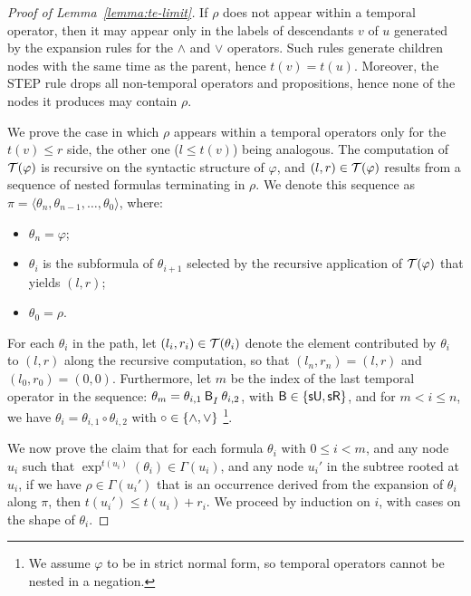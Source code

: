\documentclass{easychair}
\begin{document}
\begin{proof}[Proof of Lemma~\ref{lemma:te-limit}]
    If $\rho$ does not appear within a temporal operator, then it may appear only in the labels of descendants $v$ of $u$ generated by the expansion rules for the $\land$ and $\lor$ operators.
    Such rules generate children nodes with the same time as the parent, hence $t(v) = t(u)$.
    Moreover, the \textsf{STEP} rule drops all non-temporal operators and propositions, hence none of the nodes it produces may contain $\rho$.

    We prove the case in which $\rho$ appears within a temporal operators only for the $t(v) \leq r$ side, the other one ($l \leq t(v)$) being analogous.
    The computation of $\tinv(\varphi)$ is recursive on the syntactic structure of $\varphi$, and $(l,r) \in \tinv(\varphi)$ results from a sequence of nested formulas terminating in $\rho$.
    We denote this sequence as $\pi = \langle \theta_n, \theta_{n-1}, \ldots, \theta_0 \rangle$, where:
    \begin{itemize}[nosep]
        \item $\theta_n = \varphi$;
        \item $\theta_{i}$ is the subformula of $\theta_{i+1}$ selected by the recursive application of $\tinv(\varphi)$ that yields $(l,r)$;
        \item $\theta_0 = \rho$.
    \end{itemize}
    For each $\theta_i$ in the path, let $(l_i, r_i) \in \tinv(\theta_i)$ denote the element contributed by $\theta_i$ to $(l, r)$ along the recursive computation, so that $(l_n, r_n) = (l, r)$ and $(l_0, r_0) = (0, 0)$.
    Furthermore, let $m$ be the index of the last temporal operator in the sequence:
    $\theta_m = \anybinop{I}{\theta_{i,1}}{\theta_{i,2}}$, with $\mathsf{B} \in \set{\suntilop, \sreleaseop}$,
    and for $m < i \leq n$, we have $\theta_i = \theta_{i,1} \circ \theta_{i,2}$ with $\circ \in \set{\land, \lor}$%
    \footnote{We assume $\varphi$ to be in strict normal form, so temporal operators cannot be nested in a negation.}.

    We now prove the claim that for each formula $\theta_i$ with $0 \leq i < m$, and any node $u_i$ such that $\exp^{t(u_i)}(\theta_i) \in \Gamma(u_i)$, and any node $u_i'$ in the subtree rooted at $u_i$, if we have $\rho \in \Gamma(u_i')$ that is an occurrence derived from the expansion of $\theta_i$ along $\pi$, then $t(u_i') \leq t(u_i) + r_i$.
    We proceed by induction on $i$, with cases on the shape of $\theta_i$.


\end{proof}
\end{document}
